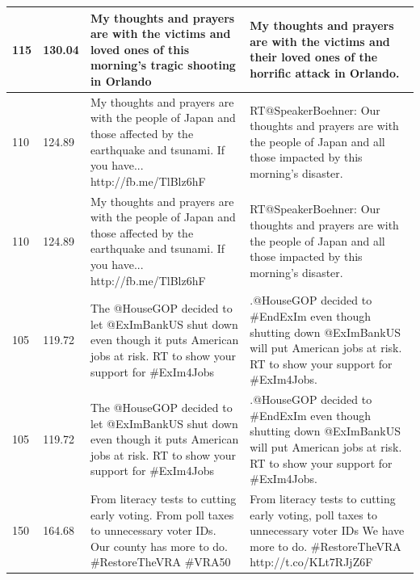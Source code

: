 \documentclass[11pt]{article}
\begin{document}
\begin{flushleft}
\begin{table}[]
\begin{tabular}{|p{}|p{}|p{}|p{}|}
115      & 130.04    & My thoughts and prayers are with the victims and loved ones of this morning's tragic shooting in Orlando                                                 & My thoughts and prayers are with the victims and their loved ones of the horrific attack in Orlando.                                                      \\ \hline
110      & 124.89    & My thoughts and prayers are with the people of Japan and those affected by the earthquake and tsunami. If you have... http://fb.me/TlBlz6hF              & RT@SpeakerBoehner: Our thoughts and prayers are with the people of Japan and all those impacted by this morning’s disaster.                               \\ \hline
110      & 124.89    & My thoughts and prayers are with the people of Japan and those affected by the earthquake and tsunami. If you have... http://fb.me/TlBlz6hF              & RT@SpeakerBoehner: Our thoughts and prayers are with the people of Japan and all those impacted by this morning’s disaster.                               \\ \hline
105      & 119.72    & The @HouseGOP decided to let @ExImBankUS shut down even though it puts American jobs at risk. RT to show your support for \#ExIm4Jobs                    & .@HouseGOP decided to \#EndExIm even though shutting down @ExImBankUS will put American jobs at risk. RT to show your support for \#ExIm4Jobs.            \\ \hline
105      & 119.72    & The @HouseGOP decided to let @ExImBankUS shut down even though it puts American jobs at risk. RT to show your support for \#ExIm4Jobs                    & .@HouseGOP decided to \#EndExIm even though shutting down @ExImBankUS will put American jobs at risk. RT to show your support for \#ExIm4Jobs.            \\ \hline
150      & 164.68    & From literacy tests to cutting early voting. From poll taxes to unnecessary voter IDs. Our county has more to do. \#RestoreTheVRA \#VRA50                & From literacy tests to cutting early voting, poll taxes to unnecessary voter IDs We have more to do. \#RestoreTheVRA http://t.co/KLt7RJjZ6F               \\ \hline
\end{tabular}
\end{table}
\newpage
\begingroup
\renewcommand{\enotesize}{\normalsize}
\theendnotes
\endgroup%
\pagebreak






\end{flushleft}%
\pagebreak
\end{document}
